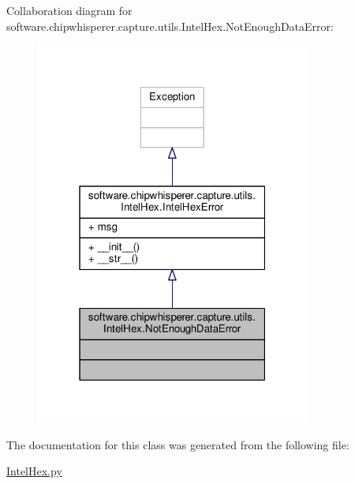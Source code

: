 Collaboration diagram for software.\+chipwhisperer.\+capture.\+utils.\+Intel\+Hex.\+Not\+Enough\+Data\+Error\+:\nopagebreak
\begin{figure}[H]
\begin{center}
\leavevmode
\includegraphics[width=256pt]{d1/d92/classsoftware_1_1chipwhisperer_1_1capture_1_1utils_1_1IntelHex_1_1NotEnoughDataError__coll__graph}
\end{center}
\end{figure}


The documentation for this class was generated from the following file\+:\begin{DoxyCompactItemize}
\item 
\hyperlink{IntelHex_8py}{Intel\+Hex.\+py}\end{DoxyCompactItemize}
